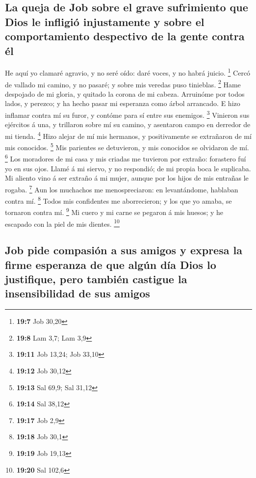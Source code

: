 \hypertarget{la-queja-de-job-sobre-el-grave-sufrimiento-que-dios-le-infligiuxf3-injustamente-y-sobre-el-comportamiento-despectivo-de-la-gente-contra-uxe9l}{%
\subsection{La queja de Job sobre el grave sufrimiento que Dios le
infligió injustamente y sobre el comportamiento despectivo de la gente
contra
él}\label{la-queja-de-job-sobre-el-grave-sufrimiento-que-dios-le-infligiuxf3-injustamente-y-sobre-el-comportamiento-despectivo-de-la-gente-contra-uxe9l}}

 He aquí yo clamaré agravio, y no seré oído: daré voces, y
no habrá juicio. \footnote{\textbf{19:7} Job 30,20}  Cercó
de vallado mi camino, y no pasaré; y sobre mis veredas puso tinieblas.
\footnote{\textbf{19:8} Lam 3,7; Lam 3,9}  Hame despojado de
mi gloria, y quitado la corona de mi cabeza.  Arruinóme por
todos lados, y perezco; y ha hecho pasar mi esperanza como árbol
arrancado.  E hizo inflamar contra mí su furor, y contóme
para sí entre sus enemigos. \footnote{\textbf{19:11} Job 13,24; Job
  33,10}  Vinieron sus ejércitos á una, y trillaron sobre
mí su camino, y asentaron campo en derredor de mi tienda. \footnote{\textbf{19:12}
  Job 30,12}  Hizo alejar de mí mis hermanos, y
positivamente se extrañaron de mí mis conocidos. \footnote{\textbf{19:13}
  Sal 69,9; Sal 31,12}  Mis parientes se detuvieron, y mis
conocidos se olvidaron de mí. \footnote{\textbf{19:14} Sal 38,12}
 Los moradores de mi casa y mis criadas me tuvieron por
extraño: forastero fuí yo en sus ojos.  Llamé á mi siervo,
y no respondió; de mi propia boca le suplicaba.  Mi aliento
vino á ser extraño á mi mujer, aunque por los hijos de mis entrañas le
rogaba. \footnote{\textbf{19:17} Job 2,9}  Aun los
muchachos me menospreciaron: en levantándome, hablaban contra mí.
\footnote{\textbf{19:18} Job 30,1}  Todos mis confidentes
me aborrecieron; y los que yo amaba, se tornaron contra mí. \footnote{\textbf{19:19}
  Job 19,13}  Mi cuero y mi carne se pegaron á mis huesos;
y he escapado con la piel de mis dientes. \footnote{\textbf{19:20} Sal
  102,6}

\hypertarget{job-pide-compasiuxf3n-a-sus-amigos-y-expresa-la-firme-esperanza-de-que-alguxfan-duxeda-dios-lo-justifique-pero-tambiuxe9n-castigue-la-insensibilidad-de-sus-amigos}{%
\subsection{Job pide compasión a sus amigos y expresa la firme esperanza
de que algún día Dios lo justifique, pero también castigue la
insensibilidad de sus
amigos}\label{job-pide-compasiuxf3n-a-sus-amigos-y-expresa-la-firme-esperanza-de-que-alguxfan-duxeda-dios-lo-justifique-pero-tambiuxe9n-castigue-la-insensibilidad-de-sus-amigos}}

